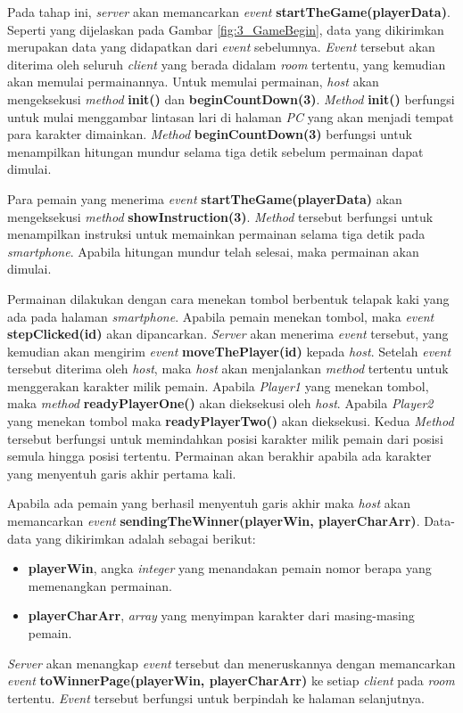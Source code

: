 Pada tahap ini, \textit{server} akan memancarkan \textit{event} \textbf{startTheGame(playerData)}. Seperti yang dijelaskan pada Gambar \ref{fig:3_GameBegin}, data yang dikirimkan merupakan data yang didapatkan dari \textit{event} sebelumnya. \textit{Event} tersebut akan diterima oleh seluruh \textit{client} yang berada didalam \textit{room} tertentu, yang kemudian akan memulai permainannya. Untuk memulai permainan, \textit{host} akan mengeksekusi \textit{method} \textbf{init()} dan \textbf{beginCountDown(3)}. \textit{Method} \textbf{init()} berfungsi untuk mulai menggambar lintasan lari di halaman \textit{PC} yang akan menjadi tempat para karakter dimainkan. \textit{Method} \textbf{beginCountDown(3)} berfungsi untuk menampilkan hitungan mundur selama tiga detik sebelum permainan dapat dimulai. 

Para pemain yang menerima \textit{event} \textbf{startTheGame(playerData)} akan mengeksekusi \textit{method} \textbf{showInstruction(3)}. \textit{Method} tersebut berfungsi untuk menampilkan instruksi untuk memainkan permainan selama tiga detik pada \textit{smartphone}. Apabila hitungan mundur telah selesai, maka permainan akan dimulai.

Permainan dilakukan dengan cara menekan tombol berbentuk telapak kaki yang ada pada halaman \textit{smartphone}. Apabila pemain menekan tombol, maka \textit{event} \textbf{stepClicked(id)} akan dipancarkan. \textit{Server} akan menerima \textit{event} tersebut, yang kemudian akan mengirim \textit{event} \textbf{moveThePlayer(id)} kepada \textit{host}. Setelah \textit{event} tersebut diterima oleh \textit{host}, maka \textit{host} akan menjalankan \textit{method} tertentu untuk menggerakan karakter milik pemain. Apabila \textit{Player1} yang menekan tombol, maka \textit{method} \textbf{readyPlayerOne()} akan dieksekusi oleh \textit{host}. Apabila \textit{Player2} yang menekan tombol maka \textbf{readyPlayerTwo()} akan dieksekusi. Kedua \textit{Method} tersebut berfungsi untuk memindahkan posisi karakter milik pemain dari posisi semula hingga posisi tertentu. Permainan akan berakhir apabila ada karakter yang menyentuh garis akhir pertama kali.

Apabila ada pemain yang berhasil menyentuh garis akhir maka \textit{host} akan memancarkan \textit{event} \textbf{sendingTheWinner(playerWin, playerCharArr)}. Data-data yang dikirimkan adalah sebagai berikut:
\begin{itemize}
	\item \textbf{playerWin}, angka \textit{integer} yang menandakan pemain nomor berapa yang memenangkan permainan.
	\item \textbf{playerCharArr}, \textit{array} yang menyimpan karakter dari masing-masing pemain.
\end{itemize}
\textit{Server} akan menangkap \textit{event} tersebut dan meneruskannya dengan memancarkan \textit{event} \textbf{toWinnerPage(playerWin, playerCharArr)} ke setiap \textit{client} pada \textit{room} tertentu. \textit{Event} tersebut berfungsi untuk berpindah ke halaman selanjutnya.


